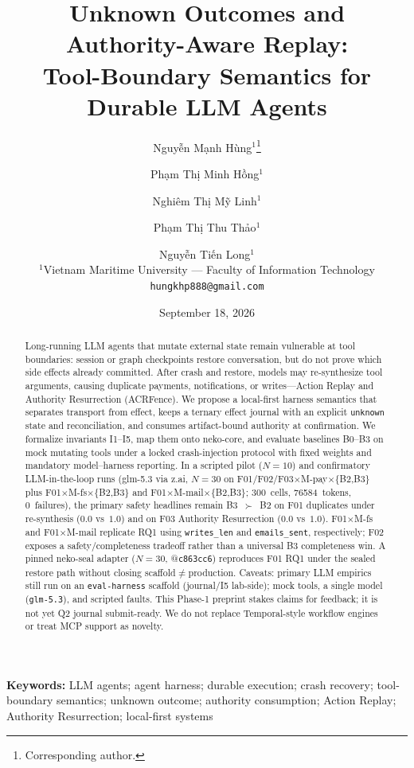 \documentclass[11pt,a4paper]{article}
\title{Unknown Outcomes and Authority-Aware Replay:\\
Tool-Boundary Semantics for Durable LLM Agents}
\author{
Nguyễn Mạnh Hùng$^{1}$\thanks{Corresponding author.} \and
Phạm Thị Minh Hồng$^{1}$ \and
Nghiêm Thị Mỹ Linh$^{1}$ \and
Phạm Thị Thu Thảo$^{1}$ \and
Nguyễn Tiến Long$^{1}$\\[0.5em]
\normalsize$^{1}$Vietnam Maritime University --- Faculty of Information Technology\\
\texttt{hungkhp888@gmail.com}
}
\date{September 18, 2026}
\begin{document}
\maketitle

\begin{abstract}
Long-running LLM agents that mutate external state remain vulnerable at
tool boundaries: session or graph checkpoints restore conversation, but do
not prove which side effects already committed. After crash and restore,
models may re-synthesize tool arguments, causing duplicate payments,
notifications, or writes---Action Replay and Authority Resurrection
(ACRFence). We propose a local-first harness semantics that separates
transport from effect, keeps a ternary effect journal with an explicit
\texttt{unknown} state and reconciliation, and consumes artifact-bound
authority at confirmation. We formalize invariants I1--I5, map them onto
neko-core, and evaluate baselines B0--B3 on mock mutating tools under a
locked crash-injection protocol with fixed weights and mandatory
model--harness reporting. In a scripted pilot ($N{=}10$) and confirmatory LLM-in-the-loop
runs (glm-5.3 via z.ai, $N{=}30$ on F01/F02/F03$\times$M-pay$\times$\{B2,B3\}
plus F01$\times$M-fs$\times$\{B2,B3\} and F01$\times$M-mail$\times$\{B2,B3\};
300~cells, 76584~tokens, 0~failures), the
primary safety headlines remain B3~$\succ$~B2 on F01 duplicates under
re-synthesis ($0.0$ vs~$1.0$) and on F03 Authority Resurrection
($0.0$ vs~$1.0$). F01$\times$M-fs and F01$\times$M-mail replicate RQ1 using
\texttt{writes\_len} and \texttt{emails\_sent}, respectively;
F02 exposes a safety/completeness tradeoff rather than a universal B3
completeness win. A pinned neko-seal adapter ($N{=}30$, @\texttt{c863cc6}) reproduces
F01 RQ1 under the sealed restore path without closing scaffold$\neq$production.
Caveats: primary LLM empirics still run on an \texttt{eval-harness} scaffold
(journal/I5 lab-side); mock tools, a single model (\texttt{glm-5.3}), and
scripted faults. This Phase-1 preprint stakes claims
for feedback; it is not yet Q2 journal submit-ready. We do not replace
Temporal-style workflow engines or treat MCP support as novelty.
\end{abstract}

\noindent\textbf{Keywords:}
LLM agents; agent harness; durable execution; crash recovery;
tool-boundary semantics; unknown outcome; authority consumption;
Action Replay; Authority Resurrection; local-first systems

\end{document}
